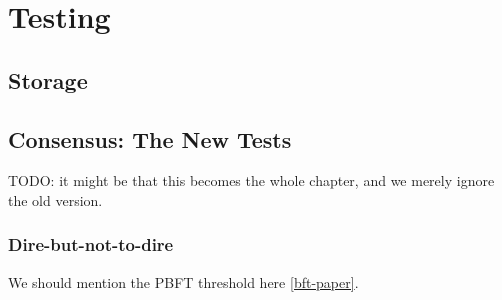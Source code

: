 \chapter{Testing}
\label{testing}

\section{Storage}

\section{Consensus: The New Tests}

TODO: it might be that this becomes the whole chapter, and we merely
ignore the old version.

\subsection{Dire-but-not-to-dire}
\label{testing:dire}

We should mention the PBFT threshold here \cref{bft-paper}.

